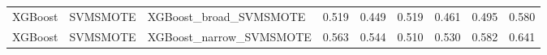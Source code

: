 \begin{tabular}{lllllllll}
                     XGBoost &            SVMSMOTE &                       XGBoost\_broad\_SVMSMOTE & 0.519 &                     0.449 &                 0.519 &                  0.461 &                                   0.495 &     0.580 \\
                     XGBoost &            SVMSMOTE &                      XGBoost\_narrow\_SVMSMOTE & 0.563 &                     0.544 &                 0.510 &                  0.530 &                                   0.582 &     0.641 \\
\bottomrule
\end{tabular}
